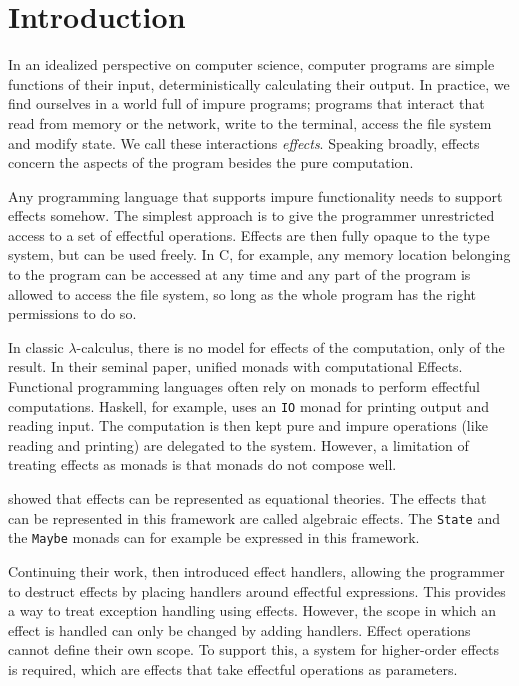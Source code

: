 \chapter{Introduction}

In an idealized perspective on computer science, computer programs are simple functions of their input, deterministically calculating their output. In practice, we find ourselves in a world full of impure programs; programs that interact that read from memory or the network, write to the terminal, access the file system and modify state. We call these interactions \emph{effects}. Speaking broadly, effects concern the aspects of the program besides the pure computation. \cite{moggi_computational_1989}

Any programming language that supports impure functionality needs to support effects somehow. The simplest approach is to give the programmer unrestricted access to a set of effectful operations. Effects are then fully opaque to the type system, but can be used freely. In C, for example, any memory location belonging to the program can be accessed at any time and any part of the program is allowed to access the file system, so long as the whole program has the right permissions to do so.

In classic $\lambda$-calculus, there is no model for effects of the computation, only of the result. In their seminal paper, \textcite{moggi_computational_1989} unified monads with computational Effects. Functional programming languages often rely on monads to perform effectful computations. Haskell, for example, uses an \texttt{IO} monad for printing output and reading input. The computation is then kept pure and impure operations (like reading and printing) are delegated to the system. However, a limitation of treating effects as monads is that monads do not compose well.

\textcite{goos_adequacy_2001} showed that effects can be represented as equational theories. The effects that can be represented in this framework are called algebraic effects. The \texttt{State} and the \texttt{Maybe} monads can for example be expressed in this framework.

Continuing their work, \textcite{castagna_handlers_2009} then introduced effect handlers, allowing the programmer to destruct effects by placing handlers around effectful expressions. This provides a way to treat exception handling using effects. However, the scope in which an effect is handled can only be changed by adding handlers. Effect operations cannot define their own scope. To support this, a system for higher-order effects is required, which are effects that take effectful operations as parameters.

